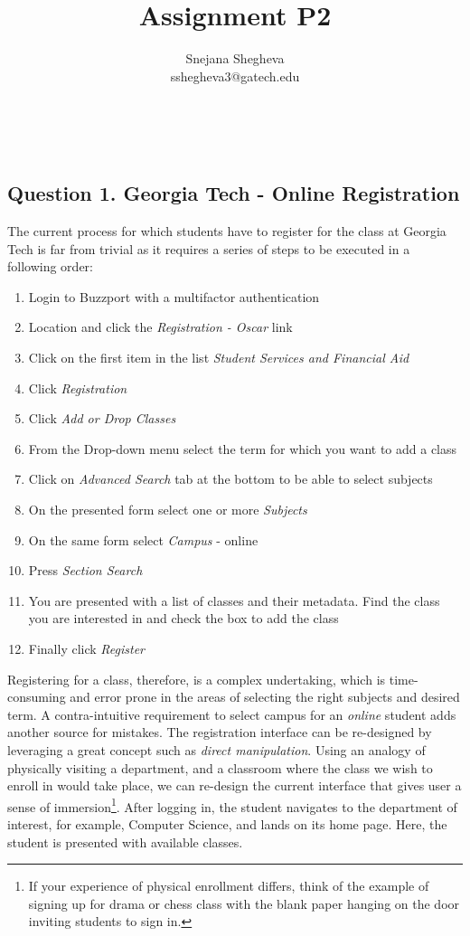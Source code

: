 \documentclass[12pt,letterpaper]{article}
\makeatletter
\renewcommand{\maketitle}{\bgroup
   \begin{center}
   \textbf{{\fontsize{18pt}{20}\selectfont \@title}}\\
   \vspace{10pt}
   {\fontsize{12pt}{0}\selectfont \@author} 
   \end{center}
}
\makeatother
\begin{document}
\title{Assignment P2}
\author{Snejana Shegheva \\ sshegheva3@gatech.edu}

\maketitle
\thispagestyle{fancy}

\subsection*{Question 1. Georgia Tech - Online Registration}
The current process for which students have to register for the class at Georgia Tech is far from trivial as it requires a series of steps to be executed in a following order:

\begin{enumerate}
    \item Login to Buzzport with a multifactor authentication
    \item Location and click the \textit{Registration - Oscar} link 
    \item Click on the first item in the list \textit{Student Services and Financial Aid}
    \item Click \textit{Registration}
    \item Click \textit{Add or Drop Classes}
    \item From the Drop-down menu select the term for which you want to add a class
    \item Click on \textit{Advanced Search} tab at the bottom to be able to select subjects
    \item On the presented form select one or more \textit{Subjects}
    \item On the same form select \textit{Campus} - online
    \item Press \textit{Section Search}
    \item You are presented with a list of classes and their metadata. Find the class you are interested in and check the box to add the class
    \item Finally click \textit{Register}
\end{enumerate}

Registering for a class, therefore, is a complex undertaking, which is time-consuming and error prone in the areas of selecting the right subjects and desired term. A contra-intuitive requirement to select campus for an \textit{online} student adds another source for mistakes.
The registration interface can be re-designed by leveraging a great concept such as \textit{direct manipulation}. Using an analogy of physically visiting a department, and a classroom where the class we wish to enroll in would take place, we can re-design the current interface that gives user a sense of immersion\footnote{If your experience of physical enrollment differs, think of the example of signing up for drama or chess class with the blank paper hanging on the door inviting students to sign in.}. After logging in, the student navigates to the department of interest, for example, Computer Science, and lands on its home page. Here, the student is presented with available classes.
\end{document}
